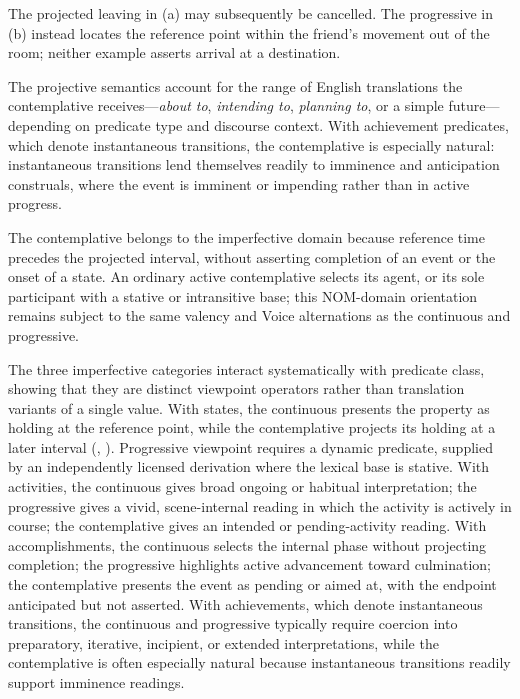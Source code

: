The projected leaving in (a) may subsequently be cancelled. The progressive
in (b) instead locates the reference point within the friend's movement out
of the room; neither example asserts arrival at a destination.

The projective semantics account for the range of English translations the
contemplative receives---\textit{about to}, \textit{intending to},
\textit{planning to}, or a simple future---depending on predicate type and
discourse context. With achievement predicates, which denote instantaneous
transitions, the contemplative is especially natural: instantaneous transitions
lend themselves readily to imminence and anticipation construals, where the
event is imminent or impending rather than in active progress.

The contemplative belongs to the imperfective domain because reference time
precedes the projected interval, without asserting completion of an event or
the onset of a state. An ordinary
active contemplative selects its agent, or its sole participant with a stative
or intransitive base; this NOM-domain orientation remains subject to the same
valency and Voice alternations as the continuous and progressive.

The three imperfective categories interact systematically with predicate class,
showing that they are distinct viewpoint operators rather than translation
variants of a single value. With states, the continuous presents the property
as holding at the reference point, while the contemplative projects its
holding at a later interval (, ). Progressive viewpoint requires a dynamic predicate, supplied by
an independently licensed derivation where the lexical base is stative.
With {activities}, the
continuous gives broad ongoing or habitual interpretation; the progressive gives
a vivid, scene-internal reading in which the activity is actively in course; the
contemplative gives an intended or pending-activity reading. With
{accomplishments}, the continuous selects the internal phase without projecting
completion; the progressive highlights active advancement toward culmination;
the contemplative presents the event as pending or aimed at, with the endpoint
anticipated but not asserted. With {achievements}, which denote instantaneous
transitions, the continuous and progressive typically require coercion into
preparatory, iterative, incipient, or extended interpretations, while the
contemplative is often especially natural because instantaneous transitions
readily support imminence readings.

